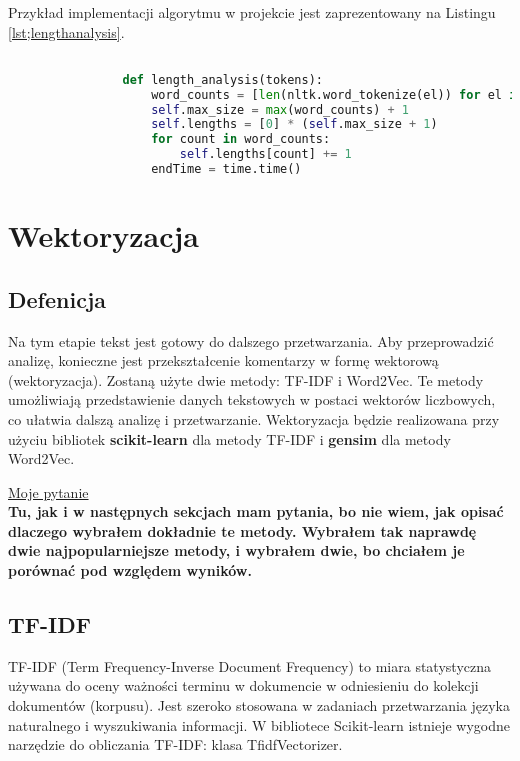 			Przykład implementacji algorytmu w projekcie jest zaprezentowany na Listingu \ref{lst;lengthanalysis}.
			\begin{lstlisting}[language=Python, caption={Funkcja przeprowadzająca analizę długości tokenów}, label={lst:lengthanalysis}]

				def length_analysis(tokens):
					word_counts = [len(nltk.word_tokenize(el)) for el in self.nlp_data]
					self.max_size = max(word_counts) + 1
					self.lengths = [0] * (self.max_size + 1)
					for count in word_counts:
						self.lengths[count] += 1
					endTime = time.time()
			\end{lstlisting}
	
	
\section{Wektoryzacja}
	
	\subsection{Defenicja}
		Na tym etapie tekst jest gotowy do dalszego przetwarzania. Aby przeprowadzić analizę, konieczne jest przekształcenie komentarzy w formę wektorową (wektoryzacja). Zostaną użyte dwie metody: TF-IDF i Word2Vec. Te metody umożliwiają przedstawienie danych tekstowych w postaci wektorów liczbowych, co ułatwia dalszą analizę i przetwarzanie. Wektoryzacja będzie realizowana przy użyciu bibliotek \textbf{scikit-learn} \cite{scikit-learn} dla metody TF-IDF i \textbf{gensim} \cite{gensim} dla metody Word2Vec. 

		\underline{Moje pytanie}\\
		\textbf{Tu, jak i w następnych sekcjach mam pytania, bo nie wiem, jak opisać dlaczego wybrałem dokładnie te metody. Wybrałem tak naprawdę dwie najpopularniejsze metody, i wybrałem dwie, bo chciałem je porównać pod względem wyników.}

	
	\subsection{TF-IDF}
 		TF-IDF (Term Frequency-Inverse Document Frequency) to miara statystyczna używana do oceny ważności terminu w dokumencie w odniesieniu do kolekcji dokumentów (korpusu). Jest szeroko stosowana w zadaniach przetwarzania języka naturalnego i wyszukiwania informacji. W bibliotece Scikit-learn istnieje wygodne narzędzie do obliczania TF-IDF: klasa TfidfVectorizer. \cite{tf-idf}
		
